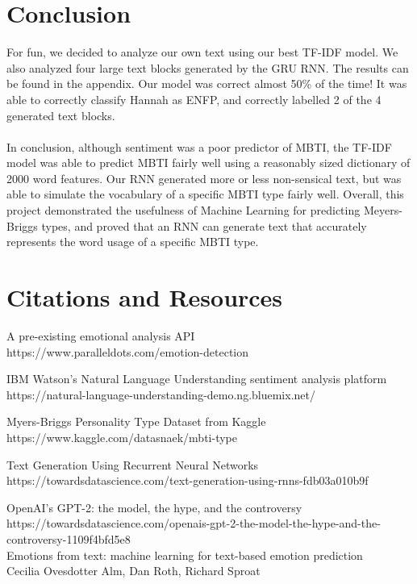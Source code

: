 \documentclass{article}
\begin{document}
\section{Conclusion}
For fun, we decided to analyze our own text using our best TF-IDF model. We also analyzed four large text blocks generated by the GRU RNN. The results can be found in the appendix. Our model was correct almost 50\% of the time! It was able to correctly classify Hannah as ENFP, and correctly labelled 2 of the 4 generated text blocks. 
\\ \\
In conclusion, although sentiment was a poor predictor of MBTI, the TF-IDF model was able to predict MBTI fairly well using a reasonably sized dictionary of 2000 word features. Our RNN generated more or less non-sensical text, but was able to simulate the vocabulary of a specific MBTI type fairly well. Overall, this project demonstrated the usefulness of Machine Learning for predicting Meyers-Briggs types, and proved that an RNN can generate text that accurately represents the word usage of a specific MBTI type.
\newpage
\section{Citations and Resources}
A pre-existing emotional analysis API \\
https://www.paralleldots.com/emotion-detection\newline
 
IBM Watson's Natural Language Understanding sentiment analysis platform\\
https://natural-language-understanding-demo.ng.bluemix.net/\newline
 
Myers-Briggs Personality Type Dataset from Kaggle\\
https://www.kaggle.com/datasnaek/mbti-type \newline

Text Generation Using Recurrent Neural Networks\\
https://towardsdatascience.com/text-generation-using-rnns-fdb03a010b9f \newline

OpenAI's GPT-2: the model, the hype, and the controversy
https://towardsdatascience.com/openais-gpt-2-the-model-the-hype-and-the-controversy-1109f4bfd5e8\\

Emotions from text: machine learning for text-based emotion prediction\\
Cecilia Ovesdotter Alm, Dan Roth, Richard Sproat\\
\end{document}
